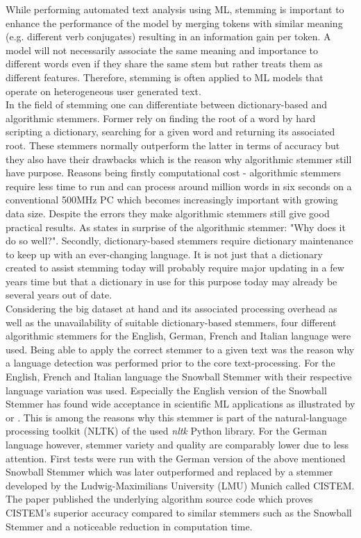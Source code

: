 While performing automated text analysis using ML, stemming is important to enhance the performance of the model by merging tokens with similar meaning (e.g. different verb conjugates) resulting in an information gain per token. A model will not necessarily associate the same meaning and importance to different words even if they share the same stem but rather treats them as different features. Therefore, stemming is often applied to ML models that operate on heterogeneous user generated text.\\

In the field of stemming one can differentiate between dictionary-based and algorithmic stemmers. Former rely on finding the root of a word by hard scripting a dictionary, searching for a given word and returning its associated root. These stemmers normally outperform the latter in terms of accuracy but they also have their drawbacks which is the reason why algorithmic stemmer still have purpose. Reasons being firstly computational cost - algorithmic stemmers require less time to run and can process around million words in six seconds on a conventional 500MHz PC \parencite{Porter2001} which becomes increasingly important with growing data size. Despite the errors they make algorithmic stemmers still give good practical results. As \textcite{Krovetz1995} states in surprise of the algorithmic stemmer: "Why does it do so well?". Secondly, dictionary-based stemmers require dictionary maintenance to keep up with an ever-changing language. It is not just that a dictionary created to assist stemming today will probably require major updating in a few years time but that a dictionary in use for this purpose today may already be several years out of date.\\

Considering the big dataset at hand and its associated processing overhead as well as the unavailability of suitable dictionary-based stemmers, four different algorithmic stemmers for the English, German, French and Italian language were used. Being able to apply the correct stemmer to a given text was the reason why a language detection was performed prior to the core text-processing. For the English, French and Italian language the Snowball Stemmer \parencite{Porter2001} with their respective language variation was used. Especially the English version of the Snowball Stemmer has found wide acceptance in scientific ML applications as illustrated by \textcite{Krauthammer2011} or \textcite{Joulin2016}. This is among the reasons why this stemmer is part of the natural-language processing toolkit (NLTK) \parencite{Manning2014} of the used \textit{nltk} Python library. For the German language however, stemmer variety and quality are comparably lower due to less attention. First tests were run with the German version of the above mentioned Snowball Stemmer which was later outperformed and replaced by a stemmer developed by the Ludwig-Maximilians University (LMU) Munich called CISTEM. The paper \textcite{Weissweiler2018} published the underlying algorithm source code which proves CISTEM's superior accuracy compared to similar stemmers such as the Snowball Stemmer and a noticeable reduction in computation time.

